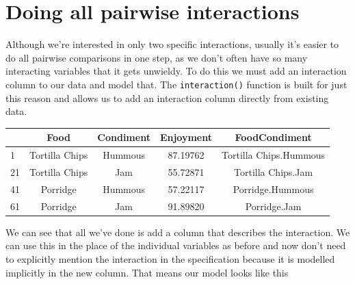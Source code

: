 \documentclass[
]{book}
\newenvironment{Shaded}{\begin{snugshade}}{\end{snugshade}}
\newcommand{\DataTypeTok}[1]{\textcolor[rgb]{0.13,0.29,0.53}{#1}}
\newcommand{\DecValTok}[1]{\textcolor[rgb]{0.00,0.00,0.81}{#1}}
\newcommand{\KeywordTok}[1]{\textcolor[rgb]{0.13,0.29,0.53}{\textbf{#1}}}
\newcommand{\NormalTok}[1]{#1}
\newcommand{\OperatorTok}[1]{\textcolor[rgb]{0.81,0.36,0.00}{\textbf{#1}}}
\newcommand{\StringTok}[1]{\textcolor[rgb]{0.31,0.60,0.02}{#1}}
\begin{document}
\hypertarget{doing-all-pairwise-interactions}{%
\section{Doing all pairwise interactions}\label{doing-all-pairwise-interactions}}

Although we're interested in only two specific interactions, usually it's easier to do all pairwise comparisons in one step, as we don't often have so many interacting variables that it gets unwieldy. To do this we must add an interaction column to our data and model that. The \texttt{interaction()} function is built for just this reason and allows us to add an interaction column directly from existing data.

\begin{Shaded}
\end{Shaded}

\begin{tabular}{l|c|c|c|c}
\hline
  & Food & Condiment & Enjoyment & FoodCondiment\\
\hline
1 & Tortilla Chips & Hummous & 87.19762 & Tortilla Chips.Hummous\\
\hline
21 & Tortilla Chips & Jam & 55.72871 & Tortilla Chips.Jam\\
\hline
41 & Porridge & Hummous & 57.22117 & Porridge.Hummous\\
\hline
61 & Porridge & Jam & 91.89820 & Porridge.Jam\\
\hline
\end{tabular}

We can see that all we've done is add a column that describes the interaction. We can use this in the place of the individual variables as before and now don't need to explicitly mention the interaction in the specification because it is modelled implicitly in the new column. That means our model looks like this
\end{document}
